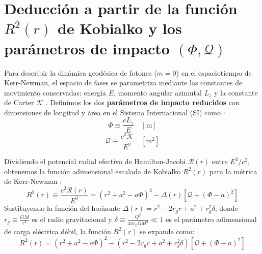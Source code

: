 
\section{Deducción a partir de la función \texorpdfstring{$R^2(r)$}{R^2(r)} de Kobialko y los parámetros de impacto \texorpdfstring{$(\Phi, \mathcal{Q})$}{(\Phi, )}}

Para describir la dinámica geodésica de fotones ($m=0$) en el espaciotiempo de Kerr-Newman, el espacio de fases se parametriza mediante las constantes de movimiento conservadas: energía $E$, momento angular azimutal $L_z$ y la constante de Carter $\mathcal{K}$ \citep{1403.5234v2, pdfcoffee.com_chandrasekhar}. Definimos los dos \textbf{parámetros de impacto reducidos} con dimensiones de longitud y área en el Sistema Internacional (SI) como \citep{Grenzebach2014, Kobialko2024}:
\begin{equation}
    \Phi \equiv \frac{c L_z}{E} \quad [\text{m}]
    \label{eq:def_Phi_SI}
\end{equation}
\begin{equation}
    \mathcal{Q} \equiv \frac{c^2 \mathcal{K}}{E^2} \quad [\text{m}^2]
    \label{eq:def_Q_SI}
\end{equation}

Dividiendo el potencial radial efectivo de Hamilton-Jacobi $\mathcal{R}(r)$ entre $E^2/c^2$, obtenemos la función adimensional escalada de Kobialko $R^2(r)$ para la métrica de Kerr-Newman \citep{perturbaciones_en_bh, Kobialko2024}:
\begin{equation}
    R^2(r) \equiv \frac{c^2 \mathcal{R}(r)}{E^2} = \left( r^2 + a^2 - a \Phi \right)^2 - \Delta(r) \left[ \mathcal{Q} + (\Phi - a)^2 \right]
    \label{eq:kobialko_R2_SI_general}
\end{equation}
Sustituyendo la función del horizonte $\Delta(r) = r^2 - 2 r_g r + a^2 + r_g^2 \delta$, donde $r_g \equiv \frac{GM}{c^2}$ es el radio gravitacional y $\delta \equiv \frac{Q^2}{4\pi\varepsilon_0 G M^2} \ll 1$ es el parámetro adimensional de carga eléctrica débil, la función $R^2(r)$ se expande como:
\begin{equation}
    R^2(r) = \left( r^2 + a^2 - a \Phi \right)^2 - \left( r^2 - 2 r_g r + a^2 + r_g^2 \delta \right) \left[ \mathcal{Q} + (\Phi - a)^2 \right]
    \label{eq:kobialko_R2_expandida_general}
\end{equation}

